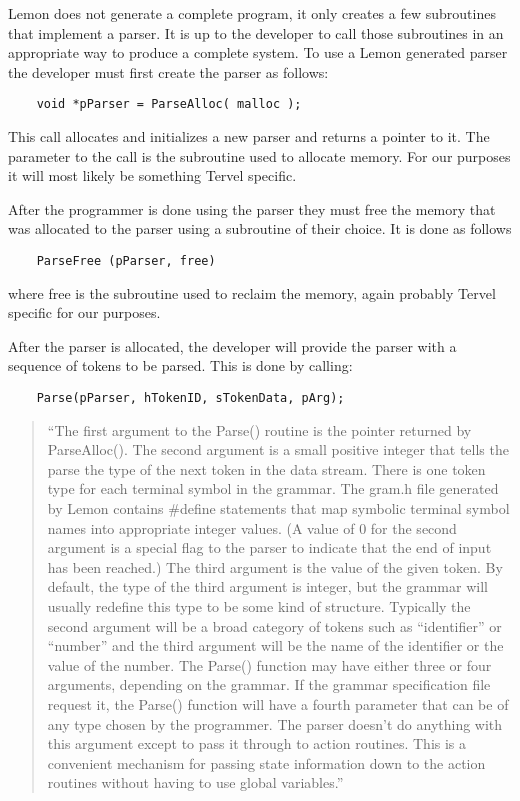\documentclass[letterpaper, 11pt]{article}
\begin{document}
Lemon does not generate a complete program, it only creates a few subroutines that
implement a parser. It is up to the developer to call those subroutines in an appropriate
way to produce a complete system. To use a Lemon generated parser the
developer must first create the parser as follows:
\begin{lstlisting}
	void *pParser = ParseAlloc( malloc );
\end{lstlisting}
This call allocates and initializes a new parser and returns a pointer to it. The
parameter to the call is the subroutine used to allocate memory. For our purposes it will
most likely be something Tervel specific.

After the programmer is done using the parser they must free the memory that was allocated
to the parser using a subroutine of their choice. It is done as follows
\begin{lstlisting}
	ParseFree (pParser, free)
\end{lstlisting}
where free is the subroutine used to reclaim the memory, again probably Tervel specific for our purposes.

After the parser is allocated, the developer will provide the parser with a sequence of
tokens to be parsed. This is done by calling:
\begin{lstlisting}
	Parse(pParser, hTokenID, sTokenData, pArg);
\end{lstlisting}

\begin{quotation}
“The first argument to the Parse() routine is the pointer returned by ParseAlloc(). The
second argument is a small positive integer that tells the parse the type of the next
token in the data stream. There is one token type for each terminal symbol in the grammar.
The gram.h file generated by Lemon contains \#define statements that map symbolic terminal
symbol names into appropriate integer values. (A value of 0 for the second argument is a
special flag to the parser to indicate that the end of input has been reached.) The third
argument is the value of the given token. By default, the type of the third argument is
integer, but the grammar will usually redefine this type to be some kind of structure.
Typically the second argument will be a broad category of tokens such as ``identifier'' or
``number'' and the third argument will be the name of the identifier or the value of the
number. The Parse() function may have either three or four arguments, depending on the
grammar. If the grammar specification file request it, the Parse() function will have a
fourth parameter that can be of any type chosen by the programmer. The parser doesn't do
anything with this argument except to pass it through to action routines. This is a
convenient mechanism for passing state information down to the action routines without
having to use global variables.”\cite{lemon_parser}
\end{quotation}
\end{document}
